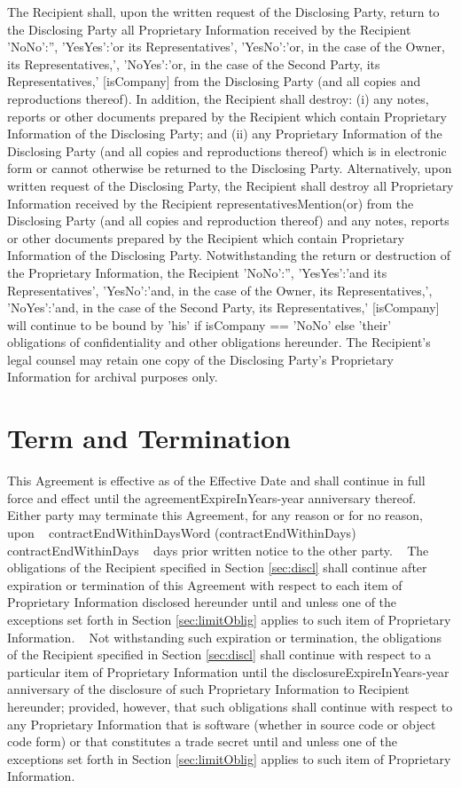 \documentclass[12pt]{article}
\newcommand{\VAR}[1]{{\color{blue}#1}}
\newcommand{\BLOCK}[1]{~\newline{ \color{red}#1 }}
\newcommand{\representativesMention}[1]{
    \VAR{
        {
            'NoNo':'',
            'YesYes':'#1 its Representatives',
            'YesNo':'#1, in the case of the Owner, its Representatives,',
            'NoYes':'#1, in the case of the Second Party, its Representatives,'
        }[isCompany]
    }
}
\begin{document}
The Recipient shall, upon the written request of the Disclosing Party, return to the Disclosing Party all Proprietary Information received by the Recipient \representativesMention{or} from the Disclosing Party (and all copies and reproductions thereof). In addition, the Recipient shall destroy:  (i) any notes, reports or other documents prepared by the Recipient which contain Proprietary Information of the Disclosing Party; and (ii) any Proprietary Information of the Disclosing Party (and all copies and reproductions thereof) which is in electronic form or cannot otherwise be returned to the Disclosing Party. Alternatively, upon written request of the Disclosing Party, the Recipient shall destroy all Proprietary Information received by the Recipient {representativesMention}(or) from the Disclosing Party (and all copies and reproduction thereof) and any notes, reports or other documents prepared by the Recipient which contain Proprietary Information of the Disclosing Party. Notwithstanding the return or destruction of the Proprietary
Information, the Recipient \representativesMention{and} will continue to be bound by
\VAR{  'his'  if isCompany == 'NoNo' else 'their' }
obligations  of confidentiality and other obligations hereunder.
The Recipient's legal counsel may retain one copy of the Disclosing Party's Proprietary Information for archival purposes only.

\section{Term and Termination}
This Agreement is effective as of the Effective Date and shall continue in full force and effect until the \VAR{agreementExpireInYears}-year anniversary thereof. Either party may terminate this Agreement, for any reason or for no reason, upon
\BLOCK{ if toPdf }
\VAR{contractEndWithinDaysWord} (\VAR{contractEndWithinDays})
\BLOCK{ else }
\VAR{contractEndWithinDays}
\BLOCK{ endif }
days prior written notice to the other party.
\BLOCK{if isDisclosurePerpetual}
The obligations of the Recipient specified in Section \ref{sec:discl} shall continue after expiration or termination of this Agreement with respect to each item of Proprietary Information disclosed hereunder until and unless one of the exceptions set forth in Section \ref{sec:limitOblig} applies to such item of Proprietary Information.
\BLOCK{ else }
Not withstanding such expiration or termination, the obligations of the Recipient specified in Section \ref{sec:discl} shall continue with respect to a particular item of Proprietary Information until the \VAR{disclosureExpireInYears}-year anniversary of the disclosure of such Proprietary Information to Recipient hereunder; provided, however, that such obligations shall continue with respect to any Proprietary Information that is software (whether in source code or object code form) or that constitutes a trade secret until and unless one of the exceptions set forth in Section \ref{sec:limitOblig} applies to such item of Proprietary Information.
\BLOCK{ endif }
\end{document}
